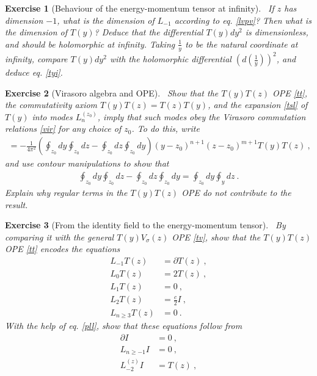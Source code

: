 \documentclass[12pt, a4paper, notitlepage, twoside]{report}
\numberwithin{equation}{section}
\theoremstyle{break}
\newtheorem{exo}{Exercise}[chapter]
\begin{document}
\begin{exo}[Behaviour of the energy-momentum tensor at infinity]
 ~\label{exoti}
 If $z$ has dimension $-1$, what is the dimension of $L_{-1}$ according to eq. \eqref{lvpv}? Then what is the dimension of $T(y)$? Deduce that the differential $T(y)dy^2$ is dimensionless, and should be holomorphic at infinity. Taking $\frac{1}{y}$ to be the natural coordinate at infinity, compare $T(y)dy^2$ with the holomorphic differential $\left(d(\frac{1}{y})\right)^2$, and deduce eq. \eqref{tyi}.
\end{exo}


\begin{exo}[Virasoro algebra and OPE] 
~\label{exott}
Show that the $T(y)T(z)$ OPE \eqref{tt}, the commutativity axiom $T(y)T(z) = T(z)T(y)$, and the expansion \eqref{tsl} of $T(y)$ into modes $L_n^{(z_0)}$, imply that such modes obey the Virasoro commutation relations \eqref{vir} for any choice of $z_0$.
To do this, write 
\begin{align}
 [L_n^{(z_0)},L_m^{(z_0)}] = -\frac{1}{4\pi^2} \left(\oint_{z_0} dy \oint_{z_0} dz - \oint_{z_0} dz \oint_{z_0} dy\right) (y-z_0)^{n+1}(z-z_0)^{m+1} T(y)T(z)\ ,
\end{align}
and use contour manipulations to show that 
\begin{align}
 \oint_{z_0} dy \oint_{z_0} dz - \oint_{z_0} dz \oint_{z_0} dy = \oint_{z_0} dy \oint_y dz\ .
\end{align}
Explain why regular terms in the $T(y)T(z)$ OPE do not contribute to the result.
\end{exo}

\begin{exo}[From the identity field to the energy-momentum tensor]
 ~\label{exoit}
By comparing it with the general $T(y)V_\sigma(z)$ OPE \eqref{tv}, show that the $T(y)T(z)$ OPE \eqref{tt} encodes the equations
\begin{align}
 L_{-1}T(z) &= \partial T(z) \ ,
\label{lmt}
\\
L_0 T(z) &= 2 T(z)\ ,
\\
L_1 T(z) &= 0 \ ,
\\
L_2 T(z) &= \frac{c}{2} I\ ,
\\
L_{n\geq 3} T(z) &= 0 \ .
\label{lgt}
\end{align}
With the help of eq. \eqref{pll}, show that these equations follow from 
\begin{align}
 \partial I & = 0\ ,
\label{piz}
\\
 L_{n\geq -1} I& = 0\ ,
\\
L_{-2}^{(z)}I & = T(z)\ ,
\label{let}
\end{align}
\end{exo}
\end{document}
